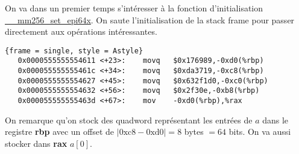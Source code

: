 \documentclass[12pt]{article}
\begin{document}
On va dans un premier temps s'intéresser à la fonction d'initialisation \url{__mm256_set_epi64x}. On saute l'initialisation de la stack frame pour passer directement aux opérations intéressantes.

\vspace{1cm}
\begin{lstlisting}{frame = single, style = Astyle}
   0x0000555555554611 <+23>:	movq   $0x176989,-0xd0(%rbp)
   0x000055555555461c <+34>:	movq   $0xda3719,-0xc8(%rbp)
   0x0000555555554627 <+45>:	movq   $0x632f1d0,-0xc0(%rbp)
   0x0000555555554632 <+56>:	movq   $0x2f30e,-0xb8(%rbp)
   0x000055555555463d <+67>:	mov    -0xd0(%rbp),%rax
\end{lstlisting}
\vspace{1cm}

On remarque qu'on stock des quadword représentant les entrées de $a$ dans le registre \textbf{rbp} avec un offset de $|0\mathrm{xc}8 - 0\mathrm{xd}0| = 8$ bytes $ = 64$ bits. On va aussi stocker dans \textbf{rax} $a[0]$.
\end{document}

